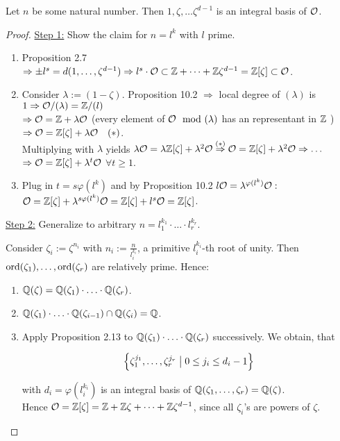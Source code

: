 \begin{Prop}
	Let $n$ be some natural number. Then $1, \zeta, \dots \zeta^{d-1}$ is an integral basis of $\mathcal{O}$.
\end{Prop}
\begin{proof}
	\underline{Step 1:} Show the claim for $n = l^k$ with $l$ prime.
	
	\begin{enumerate}[(1)]
		\item Proposition 2.7 $\Rightarrow \pm l^s = d(1, \dots, \zeta^{d-1}) \Rightarrow l^s\cdot \mathcal{O} \subset \mathbb{Z} + \dots + \mathbb{Z} \zeta^{d-1} = \mathbb{Z}[\zeta] \subset \mathcal{O}$.
		
		\item Consider $\lambda := (1-\zeta)$. Proposition 10.2 $\Rightarrow$ local degree of $(\lambda)$ is $1 \Rightarrow \mathcal{O}/(\lambda) =\mathbb{Z}/(l)$\\
		$\Rightarrow \mathcal{O} = \mathbb{Z} + \lambda \mathcal{O}$ (every element of $\mathcal{O} \mod (\lambda)$ has an representant in $\mathbb{Z}$ )\\
		 $\Rightarrow \mathcal{O} = \mathbb{Z}[\zeta] + \lambda \mathcal{O} \quad (*)$.\\
		 Multiplying with $\lambda$ yields $\lambda \mathcal{O} = \lambda \mathbb{Z}[\zeta] + \lambda^2 \mathcal{O} \overset{(*)}{\Rightarrow} \mathcal{O} = \mathbb{Z}[\zeta] + \lambda^2 \mathcal{O} \Rightarrow \dots$\\
		 $\Rightarrow \mathcal{O} = \mathbb{Z}[\zeta] + \lambda^t \mathcal{O}$ $\forall t \geq 1$.
		
		\item Plug in $t = s\varphi(l^k)$ and by Proposition 10.2 $l \mathcal{O} = \lambda^{\varphi(l^k)} \mathcal{O}:$\\
		$\mathcal{O} = \mathbb{Z}[\zeta] + \lambda^{s \varphi(l^k)} \mathcal{O} =  \mathbb{Z}[\zeta] + l^s \mathcal{O} = \mathbb{Z}[\zeta]$.
	\end{enumerate}

	\bigskip
	
	\underline{Step 2:} Generalize to arbitrary $n = l_1^{k_1} \cdot \ldots \cdot l_r^{k_r}$.
		
	Consider $\zeta_i := \zeta^{n_i}$ with $n_i := \frac{n}{l_i^{k_i}}$, a primitive $l_i^{k_i}$-th root of unity. Then $\operatorname{ord}(\zeta_1), \dots, \operatorname{ord}(\zeta_r)$ are relatively prime. Hence:
	
	\begin{enumerate}[(1)]
		\item $\mathbb{Q}(\zeta) = \mathbb{Q}(\zeta_1) \cdot \ldots \cdot \mathbb{Q}(\zeta_r)$.
		
		\item $\mathbb{Q}(\zeta_1) \cdot \ldots \cdot \mathbb{Q}(\zeta_{i-1}) \cap \mathbb{Q}(\zeta_i) = \mathbb{Q}$.
		
		\item Apply Proposition 2.13  to $\mathbb{Q}(\zeta_1) \cdot \ldots \cdot \mathbb{Q}(\zeta_r)$ successively. We obtain, that
		
		\[\left\{ {\zeta_1^{j_1}, \dots, \zeta_r^{j_r}} \bigm| {0 \leq j_i \leq d_i -1} \right\} \]
		
		with $d_i = \varphi(l_i^{k_i})$ is an integral basis of $\mathbb{Q}(\zeta_1, \dots, \zeta_r) = \mathbb{Q}(\zeta)$.\\
		Hence $\mathcal{O} = \mathbb{Z}[\zeta] = \mathbb{Z} + \mathbb{Z} \zeta + \dots + \mathbb{Z} \zeta^{d-1}$, since all $\zeta_i$'s are powers of $\zeta$.
	\end{enumerate}
\end{proof}


